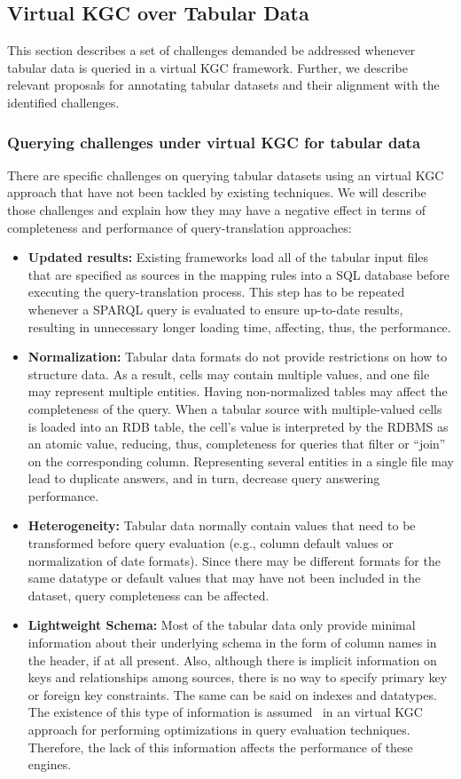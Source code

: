 \subsection{Virtual KGC over Tabular Data}
This section describes a set of challenges demanded be addressed whenever tabular data is queried in a virtual KGC framework. Further, we describe relevant proposals for annotating tabular datasets and their alignment with the identified challenges.

\subsubsection{Querying challenges under virtual KGC for tabular data}
There are specific challenges on querying tabular datasets using an virtual KGC approach that have not been tackled by existing techniques. We will describe those challenges and explain how they may have a negative effect in terms of completeness and performance of query-translation approaches:
\begin{itemize}
    \item \textbf{Updated results:} Existing frameworks load all of the tabular input files that are specified as sources in the mapping rules into a SQL database before executing the query-translation process. This step has to be repeated whenever a SPARQL query is evaluated to ensure up-to-date results, resulting in unnecessary longer loading time, affecting, thus, the performance.
    \item \textbf{Normalization:} Tabular data formats do not provide restrictions on how to structure data. As a result, cells may contain multiple values, and one file may represent multiple entities. Having non-normalized tables may affect the completeness of the query. When a tabular source with multiple-valued cells is loaded into an RDB table, the cell's value is interpreted by the RDBMS as an atomic value, reducing, thus, completeness for queries that filter or ``join'' on the corresponding column. Representing several entities in a single file may lead to duplicate answers, and in turn, decrease query answering performance.
    \item\textbf{Heterogeneity:} Tabular data normally contain values that need to be transformed before query evaluation (e.g., column default values or normalization of date formats). Since there may be different formats for the same datatype or default values that may have not been included in the dataset, query completeness can be affected.
    \item \textbf{Lightweight Schema:} Most of the tabular data only provide minimal information about their underlying schema in the form of column names in the header, if at all present. Also, although there is implicit information on keys and relationships among sources, there is no way to specify primary key or foreign key constraints. The same can be said on indexes and datatypes. The existence of this type of information is assumed~\citep{xiao2018obdasurvey} in an virtual KGC approach for performing optimizations in query evaluation techniques. Therefore, the lack of this information affects the performance of these engines.
\end{itemize}

